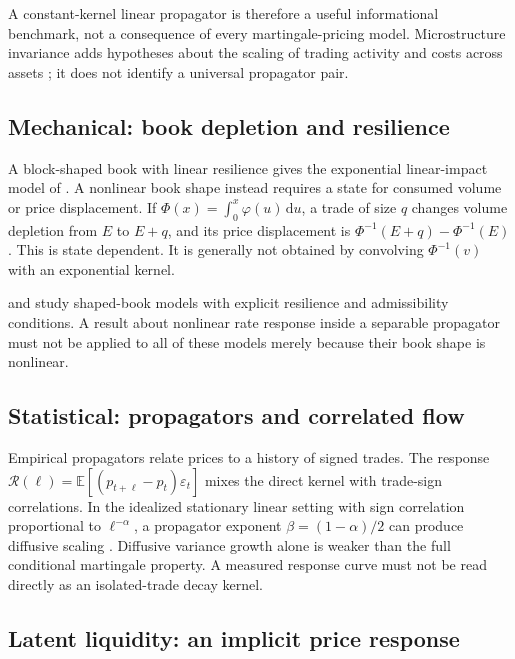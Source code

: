 \documentclass[11pt]{article}
\numberwithin{equation}{section}
\theoremstyle{definition}
\theoremstyle{remark}
\newcommand{\E}{\mathbb{E}}
\theoremstyle{definition}
\newcommand{\dd}{\,\mathrm d}
\begin{document}
A constant-kernel linear propagator is therefore a useful informational benchmark,
not a consequence of every martingale-pricing model. Microstructure invariance
adds hypotheses about the scaling of trading activity and costs across assets
\citep{kyleobizhaeva2016}; it does not identify a universal propagator pair.

\subsection{Mechanical: book depletion and resilience}

A block-shaped book with linear resilience gives the exponential linear-impact
model of \citet{obizhaevawang2013}. A nonlinear book shape instead requires a
state for consumed volume or price displacement. If
$\Phi(x)=\int_0^x\varphi(u)\dd u$, a trade of size $q$ changes volume depletion
from $E$ to $E+q$, and its price displacement is
$\Phi^{-1}(E+q)-\Phi^{-1}(E)$. This is state dependent. It is generally not
obtained by convolving $\Phi^{-1}(v)$ with an exponential kernel.

\citet{alfonsifruthschied2010} and \citet{predoiu2011} study shaped-book models
with explicit resilience and admissibility conditions. A result about nonlinear
rate response inside a separable propagator must not be applied to all of these
models merely because their book shape is nonlinear.

\subsection{Statistical: propagators and correlated flow}

Empirical propagators relate prices to a history of signed trades. The response
$\mathcal R(\ell)=\E[(p_{t+\ell}-p_t)\varepsilon_t]$ mixes the direct kernel with
trade-sign correlations. In the idealized stationary linear setting with sign
correlation proportional to $\ell^{-\alpha}$, a propagator exponent
$\beta=(1-\alpha)/2$ can produce diffusive scaling
\citep{bouchaud2004,lilloFarmer2004}. Diffusive variance growth alone is weaker
than the full conditional martingale property. A measured response curve must not
be read directly as an isolated-trade decay kernel.

\subsection{Latent liquidity: an implicit price response}
\end{document}
